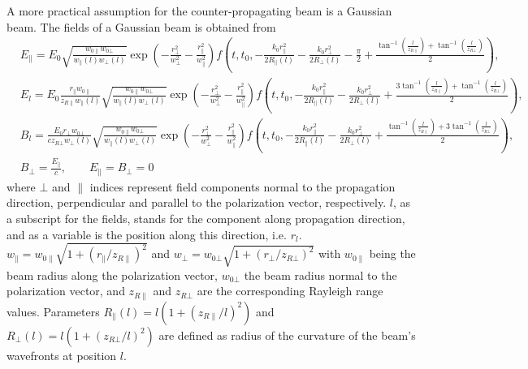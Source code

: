 A more practical assumption for the counter-propagating beam is a Gaussian beam.
%
The fields of a Gaussian beam is obtained from
%
\begin{align}
\label{opticalUndulatorGB}
& E_\parallel = E_0 \sqrt{\frac{w_{0\parallel}w_{0\bot}}{w_\parallel (l)w_\bot (l)}} 
\exp\left( -\frac{r_\bot^2}{w_\bot^2}-\frac{r_\parallel^2}{w_\parallel^2} \right) 
f\left(t,t_0,-\frac{k_0 r_\parallel^2}{2R_\parallel(l)} - \frac{k_0 r_\bot^2}{2R_\bot(l)} - \frac{\pi}{2} + \frac{ \tan^{-1} \left(\frac{l}{z_{R\parallel}}\right) + \tan^{-1} \left(\frac{l}{z_{R\bot}} \right) }{2} \right), \nonumber \\
& E_l = E_0 \frac{r_\parallel w_{0\parallel}}{z_{R\parallel} w_\parallel(l)} \sqrt{\frac{w_{0\parallel}w_{0\bot}}{w_\parallel(l)w_\bot (l)}} 
\exp\left( -\frac{r_\bot^2}{w_\bot^2}-\frac{r_\parallel^2}{w_\parallel^2} \right) 
f\left(t,t_0,-\frac{k_0 r_\parallel^2}{2R_\parallel(l)} - \frac{k_0 r_\bot^2}{2R_\bot(l)} + \frac{ 3\tan^{-1} \left(\frac{l}{z_{R\parallel}}\right) + \tan^{-1} \left(\frac{l}{z_{R\bot}} \right) }{2} \right), \nonumber \\
& B_l = \frac{E_0 r_\bot w_{0\bot}}{c z_{R\bot} w_\bot(l)} \sqrt{\frac{w_{0\parallel}w_{0\bot}}{w_\parallel (l)w_\bot (l)}} 
\exp\left( -\frac{r_\bot^2}{w_\bot^2}-\frac{r_\parallel^2}{w_\parallel^2} \right) 
f\left(t,t_0,-\frac{k_0 r_\parallel^2}{2R_\parallel(l)} - \frac{k_0 r_\bot^2}{2R_\bot(l)} + \frac{ \tan^{-1} \left(\frac{l}{z_{R\parallel}}\right) + 3 \tan^{-1} \left(\frac{l}{z_{R\bot}} \right) }{2} \right), \nonumber \\
& B_\bot = \frac{E_\parallel}{c}, \qquad E_\parallel = B_\bot = 0
\end{align}
%
where $\bot$ and $\parallel$ indices represent field components normal to the propagation direction, perpendicular and parallel to the polarization vector, respectively.
%
$l$, as a subscript for the fields, stands for the component along propagation direction, and as a variable is the position along this direction, i.e. $r_l$.
%
$w_\parallel=w_{0\parallel}\sqrt{1+(r_\parallel/z_{R\parallel})^2}$ and $w_\bot=w_{0\bot}\sqrt{1+(r_\bot/z_{R\bot})^2}$ with $w_{0\parallel}$ being the beam radius along the polarization vector, $w_{0\bot}$ the beam radius normal to the polarization vector, and $z_{R\parallel}$ and $z_{R\bot}$ are the corresponding Rayleigh range values.
%
Parameters $R_\parallel(l)=l(1+(z_{R\parallel}/l)^2)$ and $R_\bot(l)=l(1+(z_{R\bot}/l)^2)$ are defined as radius of the curvature of the beam's wavefronts at position $l$.

